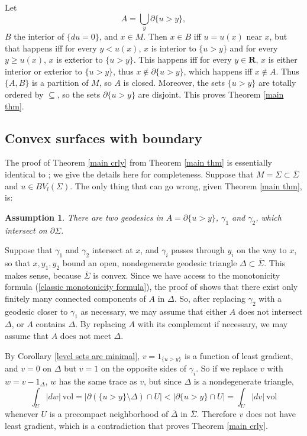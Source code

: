 \documentclass[reqno,12pt,letterpaper]{amsart}
\newcommand{\RR}{\mathbf{R}}
\newcommand{\vol}{\mathrm{vol}}
\newtheorem{assumption}[theorem]{Assumption}
\theoremstyle{definition}
\numberwithin{equation}{section}
\begin{document}
Let
\begin{equation}\label{lamination union}
A = \bigcup_y \partial \{u > y\},
\end{equation} $B$ the interior of $\{du = 0\}$, and $x \in M$.
Then $x \in B$ iff $u = u(x)$ near $x$, but that happens iff for every $y < u(x)$, $x$ is interior to $\{u > y\}$ and for every $y \geq u(x)$, $x$ is exterior to $\{u > y\}$.
This happens iff for every $y \in \RR$, $x$ is either interior or exterior to $\{u > y\}$, thus $x \notin \partial \{u > y\}$, which happens iff $x \notin A$.
Thus $\{A, B\}$ is a partition of $M$, so $A$ is closed.
Moreover, the sets $\{u > y\}$ are totally ordered by $\subseteq$, so the sets $\partial \{u > y\}$ are disjoint.
This proves Theorem \ref{main thm}.

\subsection{Convex surfaces with boundary}
The proof of Theorem \ref{main crly} from Theorem \ref{main thm} is essentially identical to \cite[Proposition 3.4]{górny2017planar}; we give the details here for completeness.
Suppose that $M = \Sigma \subset \overline \Sigma$ and $u \in BV_l(\Sigma)$.
The only thing that can go wrong, given Theorem \ref{main thm}, is:

\begin{assumption}
There are two geodesics in $A = \partial \{u > y\}$, $\gamma_1$ and $\gamma_2$, which intersect on $\partial \Sigma$.
\end{assumption}

Suppose that $\gamma_1$ and $\gamma_2$ intersect at $x$, and $\gamma_i$ passes through $y_i$ on the way to $x$, so that $x,y_1,y_2$ bound an open, nondegenerate geodesic triangle $\Delta \subset \overline \Sigma$. This makes sense, because $\overline \Sigma$ is convex.
Since we have access to the monotonicity formula (\ref{classic monotonicity formula}), the proof of \cite[Remark 37.9]{simon1983GMT} shows that there exist only finitely many connected components of $A$ in $\Delta$.
So, after replacing $\gamma_2$ with a geodesic closer to $\gamma_1$ as necessary, we may assume that either $A$ does not intersect $\Delta$, or $A$ contains $\Delta$.
By replacing $A$ with its complement if necessary, we may assume that $A$ does not meet $\Delta$.

By Corollary \ref{level sets are minimal}, $v = 1_{\{u > y\}}$ is a function of least gradient, and $v = 0$ on $\Delta$ but $v = 1$ on the opposite sides of $\gamma_i$.
So if we replace $v$ with $w = v - 1_\Delta$, $w$ has the same trace as $v$, but since $\Delta$ is a nondegenerate triangle,
$$\int_U |dw| ~\vol = |\partial(\{u > y\} \setminus \Delta) \cap U| < |\partial \{u > y\} \cap U| = \int_U |dv| ~\vol$$
whenever $U$ is a precompact neighborhood of $\overline \Delta$ in $\overline \Sigma$.
Therefore $v$ does not have least gradient, which is a contradiction that proves Theorem \ref{main crly}.
\end{document}
